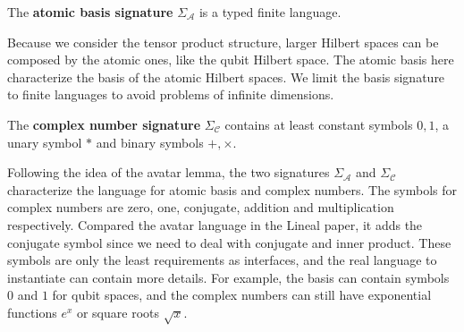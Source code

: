 \documentclass[manuscript, review, timestamp]{acmart}
\begin{document}
\begin{definition} 
  The \textbf{atomic basis signature} $\Sigma_\mathcal{A}$ is a  typed finite language.
\end{definition}

Because we consider the tensor product structure, larger Hilbert spaces can be composed by the atomic ones, like the qubit Hilbert space. The atomic basis here characterize the basis of the atomic Hilbert spaces.
We limit the basis signature to finite languages to avoid problems of infinite dimensions.

\begin{definition} 
  The \textbf{complex number signature} $\Sigma_\mathcal{C}$ contains at least constant symbols $0, 1$, a unary symbol $*$ and binary symbols $+, \times$.
\end{definition}

Following the idea of the avatar lemma, the two signatures $\Sigma_\mathcal{A}$ and $\Sigma_\mathcal{C}$ characterize the language for atomic basis and complex numbers. 
The symbols for complex numbers are zero, one, conjugate, addition and multiplication respectively. Compared the avatar language in the Lineal paper\cite{Arrighi2017}, it adds the conjugate symbol since we need to deal with conjugate and inner product.
These symbols are only the least requirements as interfaces, and the real language to instantiate can contain more details. For example, the basis can contain symbols $0$ and $1$ for qubit spaces, and the complex numbers can still have exponential functions $e^x$ or square roots $\sqrt{x}$.
\end{document}
